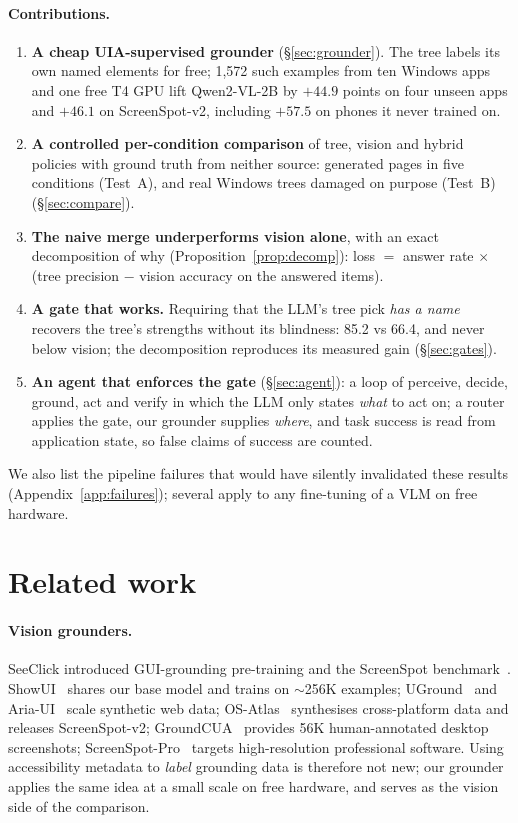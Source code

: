 \documentclass[11pt]{article}
\begin{document}
\paragraph{Contributions.}
\begin{enumerate}[leftmargin=*,itemsep=2pt]
\item \textbf{A cheap UIA-supervised grounder} (\S\ref{sec:grounder}). The tree labels its own named
elements for free; 1,572 such examples from ten Windows apps and one free T4 GPU lift Qwen2-VL-2B by
$+44.9$ points on four unseen apps and $+46.1$ on ScreenSpot-v2, including $+57.5$ on phones it never
trained on.
\item \textbf{A controlled per-condition comparison} of tree, vision and hybrid policies with ground truth
from neither source: generated pages in five conditions (Test~A), and real Windows trees damaged on
purpose (Test~B) (\S\ref{sec:compare}).
\item \textbf{The naive merge underperforms vision alone}, with an exact decomposition of why
(Proposition~\ref{prop:decomp}): loss $=$ answer rate $\times$ (tree precision $-$ vision accuracy on the
answered items).
\item \textbf{A gate that works.} Requiring that the LLM's tree pick \emph{has a name} recovers the tree's
strengths without its blindness: 85.2 vs 66.4, and never below vision; the decomposition reproduces its
measured gain (\S\ref{sec:gates}).
\item \textbf{An agent that enforces the gate} (\S\ref{sec:agent}): a loop of perceive, decide, ground, act
and verify in which the LLM only states \emph{what} to act on; a router applies the gate, our grounder supplies
\emph{where}, and task success is read from application state, so false claims of success are counted.
\end{enumerate}
We also list the pipeline failures that would have silently invalidated these results
(Appendix~\ref{app:failures}); several apply to any fine-tuning of a VLM on free hardware.

\section{Related work}

\paragraph{Vision grounders.} SeeClick introduced GUI-grounding pre-training and the ScreenSpot
benchmark~\citep{cheng2024seeclick}. ShowUI~\citep{lin2025showui} shares our base model and trains on
$\sim$256K examples; UGround~\citep{gou2025uground} and Aria-UI~\citep{yang2025ariaui} scale synthetic
web data; OS-Atlas~\citep{wu2025osatlas} synthesises cross-platform data and releases ScreenSpot-v2;
GroundCUA~\citep{feizi2026groundcua} provides 56K human-annotated desktop screenshots; ScreenSpot-Pro~\citep{li2025screenspotpro}
targets high-resolution professional software. Using accessibility metadata to \emph{label} grounding data
is therefore not new; our grounder applies the same idea at a small scale on free hardware, and serves as
the vision side of the comparison.
\end{document}
